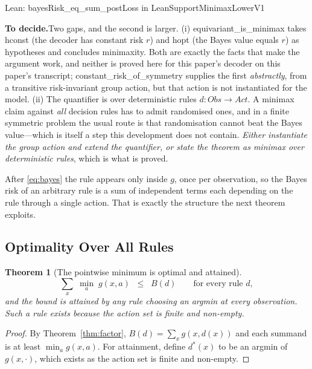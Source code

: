 \documentclass[conference]{IEEEtran}
\newtheorem{theorem}{Theorem}
\theoremstyle{definition}
\newcommand{\lean}[1]{\textsf{\footnotesize #1}}
\newcommand{\leanbox}[1]{%
  \par\vspace{2pt}\noindent
  {\footnotesize\textsf{Lean: #1}}\par\vspace{2pt}}
\newif\ifshownotes\shownotestrue
\newcommand{\TODOPAR}[1]{\ifshownotes\par\vspace{2pt}\noindent%
  {\color{todocol}\textsf{\footnotesize\textbf{To decide.}\;#1}}\par\vspace{2pt}\fi}
\begin{document}
\leanbox{\lean{bayesRisk\_eq\_sum\_postLoss} in \lean{LeanSupportMinimaxLowerV1}}
\TODOPAR{Two gaps, and the second is larger. (i) \lean{equivariant\_is\_minimax} takes
\lean{hconst} (the decoder has constant risk $r$) and \lean{hopt} (the Bayes value equals
$r$) as hypotheses and concludes minimaxity. Both are exactly the facts that make the
argument work, and neither is proved here for this paper's decoder on this paper's
transcript; \lean{constant\_risk\_of\_symmetry} supplies the first \emph{abstractly}, from a
transitive risk-invariant group action, but that action is not instantiated for the model.
(ii) The quantifier is over deterministic rules $d:\mathit{Obs}\to\mathit{Act}$. A minimax
claim against \emph{all} decision rules has to admit randomised ones, and in a finite
symmetric problem the usual route is that randomisation cannot beat the Bayes value---which
is itself a step this development does not contain. \emph{Either instantiate the group action
and extend the quantifier, or state the theorem as minimax over deterministic rules}, which
is what is proved.}

After \eqref{eq:bayes} the rule appears only inside $g$, once per observation, so the Bayes
risk of an arbitrary rule is a sum of independent terms each depending on the rule through a
single action. That is exactly the structure the next theorem exploits.

\subsection{Optimality Over All Rules}
\label{sec:minimax}

\begin{theorem}[The pointwise minimum is optimal and attained]
\label{thm:optimal}
\begin{equation}
\sum_{x}\;\min_{a}\;g(x,a)\;\;\leq\;\;B(d)
\qquad\text{for every rule } d,
\label{eq:optimal}
\end{equation}
and the bound is attained by any rule choosing an argmin at every observation. Such a rule
exists because the action set is finite and non-empty.
\end{theorem}

\begin{proof}
By Theorem~\ref{thm:factor}, $B(d)=\sum_{x}g(x,d(x))$ and each summand is at least
$\min_{a}g(x,a)$. For attainment, define $d^{*}(x)$ to be an argmin of $g(x,\cdot)$, which
exists as the action set is finite and non-empty.
\end{proof}
\end{document}
